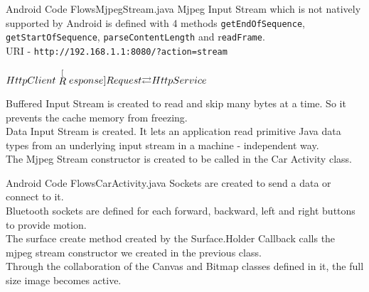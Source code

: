 \documentclass[xcolor=table, 9pt]{beamer}
\begin{document}
\begin{frame}{Android Code Flows}{MjpegStream.java}
{} Mjpeg Input Stream which is not natively supported by Android is defined with 4 methods \texttt{getEndOfSequence}, \texttt{getStartOfSequence}, \texttt{parseContentLength} and r\texttt{eadFrame}.\\
\vspace{0.3cm}
{} URI - \texttt{http://192.168.1.1:8080/?action=stream}\\
\begin{center}
\( Http Client \stackrel[Response]{Request}{{\Large \rightleftarrows}} Http Service \)\\
\end{center}
\vspace{0.3cm}
{} Buffered Input Stream is created to read and skip many bytes at a time. So it prevents the cache memory from freezing.\\
\vspace{0.3cm}
{} Data Input Stream is created. It lets an application read primitive Java data types from an underlying input stream in a machine - independent way.\\
\vspace{0.3cm}
{} The Mjpeg Stream constructor is created to be called in the Car Activity class.
\end{frame}



\begin{frame}{Android Code Flows}{CarActivity.java}
{} Sockets are created to send a data or connect to it.\\
\vspace{0.3cm}
{} Bluetooth sockets are defined for each forward, backward, left and right buttons to provide motion.\\
\vspace{0.3cm}
{} The surface create method created by the Surface.Holder Callback calls the mjpeg stream constructor we created in the previous class.\\
\vspace{0.3cm}
{} Through the collaboration of the Canvas and Bitmap classes defined in it, the full size image becomes active.\\
\vspace{0.3cm}
\carActivity
\end{frame}
\end{document}
